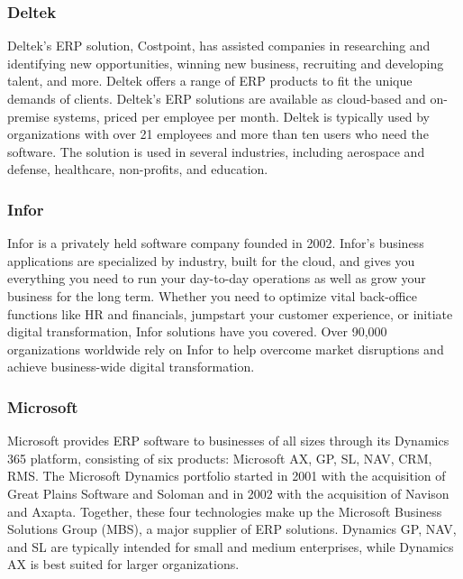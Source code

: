 \subsubsection*{Deltek}

Deltek’s ERP solution, Costpoint, has assisted companies in researching and identifying new opportunities, winning new business, recruiting and developing talent, and more. Deltek offers a range of ERP products to fit the unique demands of clients. Deltek’s ERP solutions are available as cloud-based and on-premise systems, priced per employee per month. Deltek is typically used by organizations with over 21 employees and more than ten users who need the software. The solution is used in several industries, including aerospace and defense, healthcare, non-profits, and education.  \cite{Nizar2021}


\subsubsection*{Infor}
Infor is a privately held software company founded in 2002. Infor’s business applications are specialized by industry, built for the cloud, and gives you everything you need to run your day-to-day operations as well as grow your business for the long term. Whether you need to optimize vital back-office functions like HR and financials, jumpstart your customer experience, or initiate digital transformation, Infor solutions have you covered. Over 90,000 organizations worldwide rely on Infor to help overcome market disruptions and achieve business-wide digital transformation.
\cite{Rachel2022}


\subsubsection*{Microsoft}
Microsoft provides ERP software to businesses of all sizes through its Dynamics 365 platform, consisting of six products: Microsoft AX, GP, SL, NAV, CRM, RMS. The Microsoft Dynamics portfolio started in 2001 with the acquisition of Great Plains Software and Soloman and in 2002 with the acquisition of Navison and Axapta. Together, these four technologies make up the Microsoft Business Solutions Group (MBS), a major supplier of ERP solutions. Dynamics GP, NAV, and SL are typically intended for small and medium enterprises, while Dynamics AX is best suited for larger organizations.

\cite{Robert2014}


